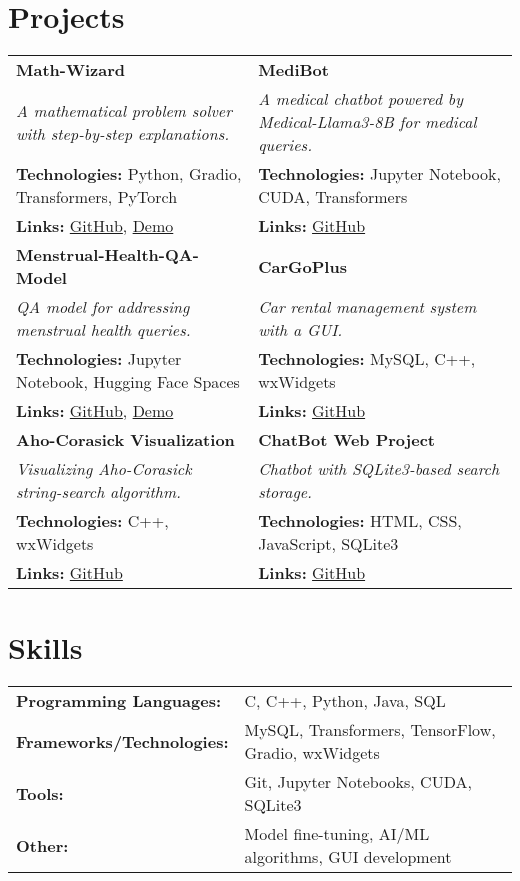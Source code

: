 \documentclass[a4paper,10pt]{article}
\begin{document}
\section{Projects}
\begin{tabularx}{\linewidth}{@{}X X@{}}
  \textbf{Math-Wizard} & \textbf{MediBot} \\
  \textit{A mathematical problem solver with step-by-step explanations.} & \textit{A medical chatbot powered by Medical-Llama3-8B for medical queries.} \\
  \textbf{Technologies:} Python, Gradio, Transformers, PyTorch & \textbf{Technologies:} Jupyter Notebook, CUDA, Transformers \\
  \textbf{Links:} \href{https://github.com/EchoSingh/Math-Wizard}{GitHub}, \href{https://huggingface.co/spaces/adi2606/Math_Wizard}{Demo} & \textbf{Links:} \href{https://github.com/EchoSingh/FastMedicalBot}{GitHub} \\[1ex]

  \textbf{Menstrual-Health-QA-Model} & \textbf{CarGoPlus} \\
  \textit{QA model for addressing menstrual health queries.} & \textit{Car rental management system with a GUI.} \\
  \textbf{Technologies:} Jupyter Notebook, Hugging Face Spaces & \textbf{Technologies:} MySQL, C++, wxWidgets \\
  \textbf{Links:} \href{https://huggingface.co/adi2606/MenstrualQA}{GitHub}, \href{https://huggingface.co/spaces/adi2606/MenstrualQA}{Demo} & \textbf{Links:} \href{https://github.com/EchoSingh/CarGoPlus}{GitHub} \\[1ex]

  \textbf{Aho-Corasick Visualization} & \textbf{ChatBot Web Project} \\
  \textit{Visualizing Aho-Corasick string-search algorithm.} & \textit{Chatbot with SQLite3-based search storage.} \\
  \textbf{Technologies:} C++, wxWidgets & \textbf{Technologies:} HTML, CSS, JavaScript, SQLite3 \\
  \textbf{Links:} \href{https://github.com/EchoSingh/AhoCorasickProject}{GitHub} & \textbf{Links:} \href{https://github.com/EchoSingh/ChatBot_WebProject}{GitHub} \\
\end{tabularx}

\section{Skills}
\begin{tabularx}{\linewidth}{@{}l X@{}}
  \textbf{Programming Languages:} & C, C++, Python, Java, SQL \\
  \textbf{Frameworks/Technologies:} & MySQL, Transformers, TensorFlow, Gradio, wxWidgets \\
  \textbf{Tools:} & Git, Jupyter Notebooks, CUDA, SQLite3 \\
  \textbf{Other:} & Model fine-tuning, AI/ML algorithms, GUI development \\
\end{tabularx}
\end{document}
